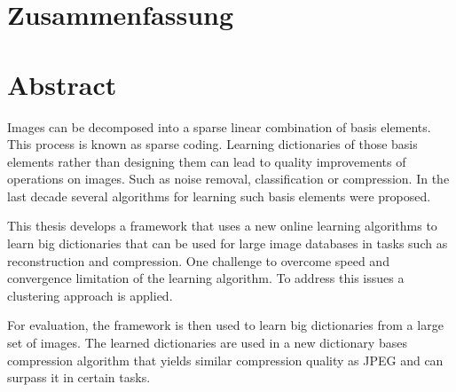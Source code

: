 \newpage
{}
{}
\chapter*{Zusammenfassung}
\thispagestyle{empty}

\newpage
{}
{}
\chapter*{Abstract}
\thispagestyle{empty}

Images can be decomposed into a sparse linear combination of basis
elements. This process is known as sparse coding. Learning dictionaries of
those basis elements rather than designing them can lead to quality improvements
of operations on images. Such as noise removal, classification or compression.
In the last decade several algorithms for learning such basis elements were
proposed.

This thesis develops a framework that uses a new online learning
algorithms to learn big dictionaries that can be used for large image databases
in tasks such as reconstruction and compression. One challenge  to overcome
speed and convergence limitation of the learning algorithm. To address this
issues a clustering approach is applied. 

For evaluation, the framework is then used to learn big dictionaries from a
large set of images. The learned dictionaries are used in a new dictionary
bases compression algorithm that yields similar compression quality as JPEG and
can surpass it in certain tasks.



